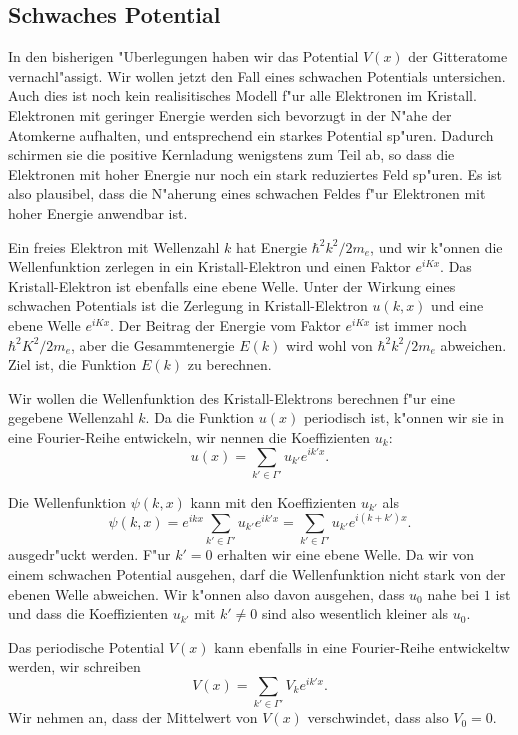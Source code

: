 \subsection{Schwaches Potential}
In den bisherigen "Uberlegungen haben wir das Potential $V(x)$ der Gitteratome
vernachl"assigt.
Wir wollen jetzt den Fall eines schwachen Potentials untersichen.
Auch dies ist noch kein realisitisches Modell f"ur alle Elektronen im 
Kristall. Elektronen mit geringer Energie werden sich bevorzugt in der
N"ahe der Atomkerne aufhalten, und entsprechend ein starkes Potential
sp"uren.
Dadurch schirmen sie die positive Kernladung wenigstens zum Teil ab, 
so dass die Elektronen mit hoher Energie nur noch ein stark reduziertes
Feld sp"uren. Es ist also plausibel, dass die N"aherung eines schwachen
Feldes f"ur Elektronen mit hoher Energie anwendbar ist.

Ein freies Elektron mit Wellenzahl $k$ hat Energie $\hbar^2k^2/2m_e$, und wir
k"onnen die Wellenfunktion zerlegen in ein Kristall-Elektron und einen
Faktor $e^{iKx}$.
Das Kristall-Elektron ist ebenfalls eine ebene Welle.
Unter der Wirkung eines schwachen Potentials ist die Zerlegung in
Kristall-Elektron $u(k,x)$ und eine ebene Welle $e^{iKx}$.
Der Beitrag der Energie vom Faktor $e^{iKx}$ ist immer noch $\hbar^2K^2/2m_e$,
aber die Gesammtenergie $E(k)$ wird wohl von $\hbar^2k^2/2m_e$ abweichen.
Ziel ist, die Funktion $E(k)$ zu berechnen.

Wir wollen die Wellenfunktion des Kristall-Elektrons berechnen 
f"ur eine gegebene Wellenzahl $k$.
Da die Funktion $u(x)$ periodisch ist, k"onnen wir sie in eine Fourier-Reihe
entwickeln, wir nennen die Koeffizienten $u_k$:
\[
u(x)=\sum_{k'\in\Gamma'} u_{k'} e^{ik'x}.
\]

Die Wellenfunktion $\psi(k,x)$ kann mit den Koeffizienten $u_{k'}$ als
\[
\psi(k,x)
=
e^{ikx}\sum_{k'\in\Gamma'}u_{k'}e^{ik'x}
=
\sum_{k'\in\Gamma'}u_{k'}e^{i(k+k')x}.
\]
ausgedr"uckt werden.
F"ur $k'=0$ erhalten wir eine ebene Welle.
Da wir von einem schwachen Potential ausgehen, darf die Wellenfunktion
nicht stark von der ebenen Welle abweichen. Wir k"onnen also davon ausgehen,
dass $u_0$ nahe bei $1$ ist und dass die Koeffizienten $u_{k'}$
mit $k'\ne 0$ sind also wesentlich kleiner als $u_0$.

Das periodische Potential $V(x)$ kann ebenfalls in eine Fourier-Reihe
entwickeltw werden, wir schreiben
\[
V(x) = \sum_{k'\in\Gamma'}V_ke^{ik'x}.
\]
Wir nehmen an, dass der Mittelwert von $V(x)$ verschwindet, dass also $V_0=0$.

